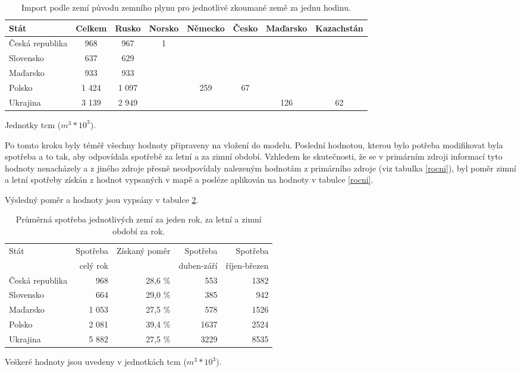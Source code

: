 \documentclass[a4paper,11pt]{article}
\begin{document}
\begin{table}[h!]
\begin{center}
\begin{tabular}{|l|c|c|c|c|c|c|c|}
    \hline
    Stát 			& Celkem	& Rusko & Norsko & Německo 	& Česko & Maďarsko & Kazachstán\\
    \hline 
    Česká republika	& 968		& 967	& 1		& 		&			&		&\\ 
    Slovensko 		& 637		& 629	& 		& 		&			&		&\\
    Maďarsko 		& 933		& 933 	&		&		&			&		&\\
    Polsko 			& 1 424	 	& 1 097 	& 		& 259	& 67			&		&\\
    Ukrajina 		& 3 139		& 2 949	& 		&		&			& 126	& 62\\ \hline
\end{tabular}
\caption{Import podle zemí původu  zemního plynu pro jednotlivé zkoumané země za jednu hodinu.}
Jednotky tcm ($m^3 * 10^3$).
\label{importdeni}
\end{center}
\end{table}


Po tomto kroku byly téměř všechny hodnoty připraveny na vložení do modelu.
Poslední hodnotou, kterou bylo potřeba modifikovat byla spotřeba a to tak,
aby odpovídala spotřebě za letní a za zimní období.
Vzhledem ke skutečnosti, že se v primárním zdroji informací tyto hodnoty nenacházely
a z jiného zdroje přesně neodpovídaly nalezeným hodnotám z primárního zdroje
(viz tabulka \ref{rocni}),
byl poměr zimní a letní spotřeby získán z hodnot vypsaných v mapě \cite{Mapka staty}
a posléze aplikován na hodnoty v tabulce \ref{rocni}.

Výsledný poměr a hodnoty jsou vypsány v tabulce
\ref{spotreba}.

\begin{table}[h!]
\begin{center}
\begin{tabular}{|l|r|r|r|r|}
    \hline
    Stát 			& Spotřeba 	& Získaný poměr & Spotřeba  & Spotřeba \\
    					& celý rok 		&			& duben-září 	& říjen-březen\\
    \hline 
    Česká republika	& 968	& 28,6 \%   	& 553	& 1382\\ 
    Slovensko 		& 664	& 29,0 \%	& 385	& 942\\
    Maďarsko 		& 1 053	& 27,5 \% 	& 578	& 1526\\
    Polsko 			& 2 081	& 39,4 \%	& 1637	& 2524\\
    Ukrajina 		& 5 882	& 27,5 \%	& 3229	& 8535\\
    \hline
\end{tabular}
\caption{Průměrná spotřeba jednotlivých zemí za jeden rok, za letní a zimní období za rok.}
Veškeré hodnoty jsou uvedeny v jednotkách tcm ($m^3 * 10^3$).
\label{spotreba}
\end{center}
\end{table} 
\end{document}
